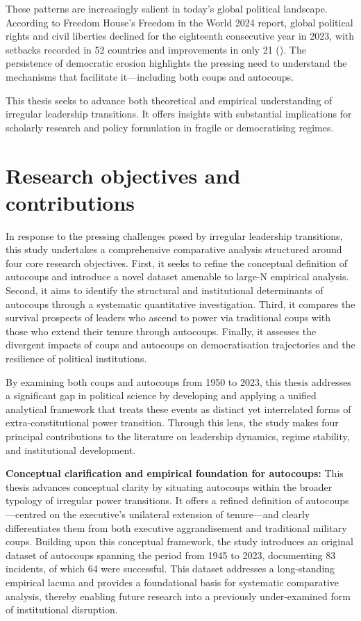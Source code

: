 \documentclass[
  12pt,
]{report}
\begin{document}
These patterns are increasingly salient in today's global political
landscape. According to Freedom House's Freedom in the World 2024
report, global political rights and civil liberties declined for the
eighteenth consecutive year in 2023, with setbacks recorded in 52
countries and improvements in only 21
(). The
persistence of democratic erosion highlights the pressing need to
understand the mechanisms that facilitate it---including both coups and
autocoups.

This thesis seeks to advance both theoretical and empirical
understanding of irregular leadership transitions. It offers insights
with substantial implications for scholarly research and policy
formulation in fragile or democratising regimes.

\section{Research objectives and
contributions}\label{research-objectives-and-contributions}

In response to the pressing challenges posed by irregular leadership
transitions, this study undertakes a comprehensive comparative analysis
structured around four core research objectives. First, it seeks to
refine the conceptual definition of autocoups and introduce a novel
dataset amenable to large-N empirical analysis. Second, it aims to
identify the structural and institutional determinants of autocoups
through a systematic quantitative investigation. Third, it compares the
survival prospects of leaders who ascend to power via traditional coups
with those who extend their tenure through autocoups. Finally, it
assesses the divergent impacts of coups and autocoups on democratisation
trajectories and the resilience of political institutions.

By examining both coups and autocoups from 1950 to 2023, this thesis
addresses a significant gap in political science by developing and
applying a unified analytical framework that treats these events as
distinct yet interrelated forms of extra-constitutional power
transition. Through this lens, the study makes four principal
contributions to the literature on leadership dynamics, regime
stability, and institutional development.

\textbf{Conceptual clarification and empirical foundation for
autocoups:} This thesis advances conceptual clarity by situating
autocoups within the broader typology of irregular power transitions. It
offers a refined definition of autocoups---centred on the executive's
unilateral extension of tenure---and clearly differentiates them from
both executive aggrandisement and traditional military coups. Building
upon this conceptual framework, the study introduces an original dataset
of autocoups spanning the period from 1945 to 2023, documenting 83
incidents, of which 64 were successful. This dataset addresses a
long-standing empirical lacuna and provides a foundational basis for
systematic comparative analysis, thereby enabling future research into a
previously under-examined form of institutional disruption.
\end{document}
